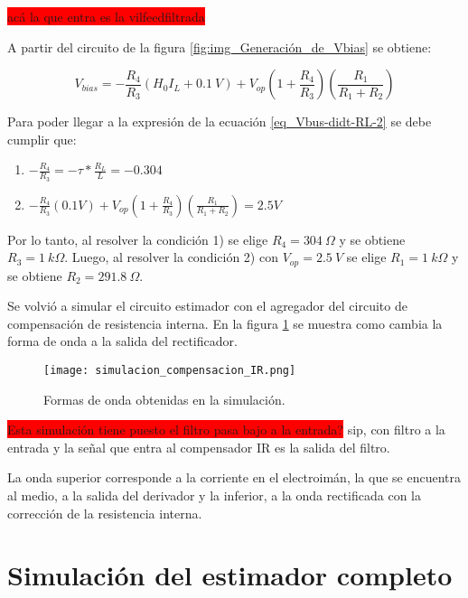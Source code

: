 \colorbox{red}{acá la que entra es la  vilfeedfiltrada}

A partir del circuito de la figura \ref{fig:img_Generación_de_Vbias} se obtiene:

\begin{equation} \label{eq_Vyf-Vbias3}
	V_{bias} =-\frac{R_4}{R_3}(H_0I_L+ 0.1\:V)+V_{op}(1+\frac{ R_4}{R_3})(\frac{R_1}{R_1+R_2})
\end{equation}

Para poder llegar a la expresión de la ecuación \ref{eq_Vbus-didt-RL-2} se debe cumplir que:

\begin{enumerate}
	\item  $-\frac{R_4}{R_3}=- \tau *\frac{R_L}{L}= -0.304$  
	
	\item  $-\frac{R_4}{R_3}(0.1V)+V_{op}(1+\frac{ R_4}{R_3})(\frac{R_1}{R_1+R_2}) = 2.5V$     
\end{enumerate}

Por lo tanto, al resolver la condición 1) se elige $R_4 = 304\: \Omega$ y se obtiene $R_3=1\:k\Omega$. Luego, al resolver la condición 2) con $V_{op}=2.5\:V$ se elige $R_1=1\:k\Omega$ y se obtiene $R_{2}=291.8\:\Omega$.

Se volvió a simular el circuito estimador con el agregador del circuito de compensación de resistencia interna. En la figura \ref{fig:img_Formas_de_onda_obtenidas_en_la_simulación} se muestra como cambia la forma de onda a la salida del rectificador.

\begin{figure}[H]
	\centering
	\texttt{[image: simulacion\_compensacion\_IR.png]}
	\caption{Formas de onda obtenidas en la simulación.}
	\label{fig:img_Formas_de_onda_obtenidas_en_la_simulación}
\end{figure}

\colorbox{red}{Esta simulación tiene puesto el filtro pasa bajo a la entrada?} sip, con filtro a la entrada y la señal que entra al compensador IR es la salida del filtro.

La onda superior corresponde a la corriente en el electroimán, la que se encuentra al medio, a la salida del derivador y la inferior, a la onda rectificada con la corrección de la resistencia interna.

\section{Simulación del estimador completo}


